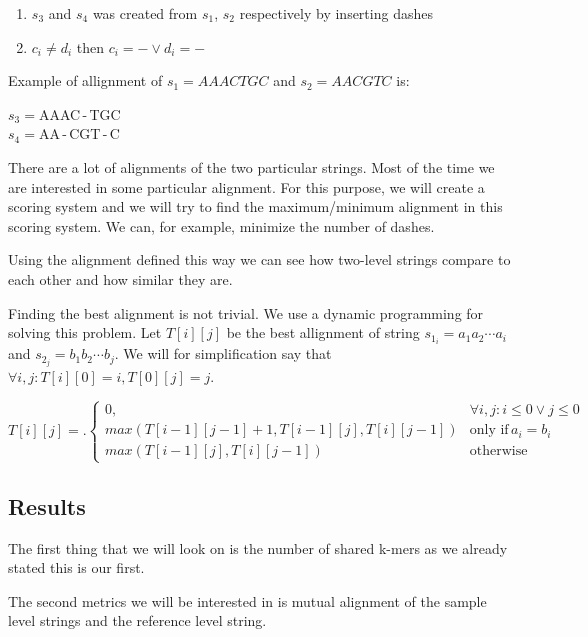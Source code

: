 \begin{enumerate}
\item $s_3$ and $s_4$ was created from $s_1$, $s_2$ respectively by inserting dashes
\item $c_i \neq d_i$ then $c_i = - \lor d_i = -$
\end{enumerate}

Example of allignment of $s_1 = AAACTGC$ and $s_2 = AACGTC$ is:

\begin{center}
$s_3 = $AAAC\,-\,TGC\\
$s_4 = $AA\,-\,CGT\,-\,C
\end{center}

There are a lot of alignments of the two particular strings. Most of the time we
are interested in some particular alignment. For this purpose, we will create a
scoring system and we will try to find the maximum/minimum alignment in this scoring
system. We can, for example, minimize the number of dashes.

Using the alignment defined this way we can see how two-level strings compare to
each other and how similar they are.

Finding the best alignment is not trivial. We use a dynamic programming for
solving this problem. Let $T[i][j]$ be the best allignment of string $s_{1_i} = a_1a_2\cdots a_i$
and $s_{2_j} = b_1b_2\cdots b_j$. We will for simplification say that $\forall i, j: T[i][0] = i, T[0][j] = j$.

\[
T[i][j] = \bigl.
  \begin{cases}
    0, & \forall i,j : i\leq 0 \lor j\leq 0 \\
    max(T[i-1][j-1] + 1, T[i-1][j], T[i][j-1]) & \text{only if} \, a_i = b_i \\ 
    max(T[i-1][j], T[i][j-1]) & \text{otherwise}
  \end{cases}
\]

\subsection{Results}

The first thing that we will look on is the number of shared k-mers as we already
stated this is our first.

The second metrics we will be interested in is mutual alignment of the sample
level strings and the reference level string.
